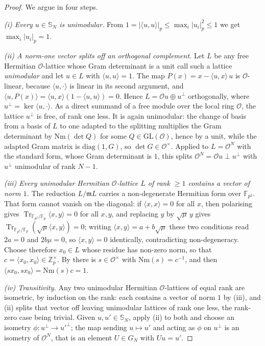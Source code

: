\documentclass{ceurart}
\theoremstyle{plain}
\theoremstyle{definition}
\theoremstyle{remark}
\theoremstyle{plain}
\newcommand{\Zp}{\mathbb{Z}_p}
\newcommand{\padicnorm}[1]{\left|#1\right|_p}
\newcommand{\inner}[2]{\langle #1, #2\rangle}
\newcommand{\OK}{\mathcal{O}}
\newcommand{\mm}{\mathfrak{m}}
\newcommand{\Sph}{\mathbb{S}}
\newcommand{\FF}{\mathbb{F}}
\newcommand{\Nm}{\mathrm{Nm}}       %
\DeclareMathOperator{\Tr}{Tr}
\begin{document}
\begin{proof}
We argue in four steps.

\emph{(i) Every $u\in\Sph_N$ is unimodular.} From
$1=\padicnorm{\inner uu}\le\max_i\padicnorm{u_i}^2\le1$ we get
$\max_i\padicnorm{u_i}=1$.

\emph{(ii) A norm-one vector splits off an orthogonal complement.} Let $L$ be
any free Hermitian $\OK$-lattice whose Gram determinant is a unit  call such
a lattice \emph{unimodular}  and let $u\in L$ with $\inner uu=1$. The map
$P(x)=x-\inner ux\,u$ is $\OK$-linear, because $\inner u\cdot$ is linear in its
second argument, and $\inner u{P(x)}=\inner ux(1-\inner uu)=0$. Hence
$L=\OK u\oplus u^{\perp}$ orthogonally, where $u^{\perp}=\ker\inner u\cdot$. As
a direct summand of a free module over the local ring $\OK$, the lattice
$u^{\perp}$ is free, of rank one less. It is again unimodular: the change of
basis from a basis of $L$ to one adapted to the splitting multiplies the Gram
determinant by $\Nm(\det Q)$ for some $Q\in\mathrm{GL}(\OK)$, hence by a unit,
while the adapted Gram matrix is $\mathrm{diag}(1,G)$, so $\det
G\in\OK^\times$. Applied to $L=\OK^{N}$ with the standard form, whose Gram
determinant is $1$, this splits $\OK^{N}=\OK u\perp u^{\perp}$ with
$u^{\perp}$ unimodular of rank $N-1$.

\emph{(iii) Every unimodular Hermitian $\OK$-lattice $L$ of rank $\ge1$
contains a vector of norm $1$.} The reduction $L/\mm L$ carries a
non-degenerate Hermitian form over $\FF_{p^2}$. That form cannot vanish on the
diagonal: if $\inner xx=0$ for all $x$, then polarising gives
$\Tr_{\FF_{p^2}/\FF_p}\inner xy=0$ for all $x,y$, and replacing $y$ by
$\sqrt\mu\,y$ gives $\Tr_{\FF_{p^2}/\FF_p}(\sqrt\mu\inner xy)=0$; writing
$\inner xy=a+b\sqrt\mu$ these two conditions read $2a=0$ and $2b\mu=0$, so
$\inner xy=0$ identically, contradicting non-degeneracy. Choose therefore
$x_0\in L$ whose residue has non-zero norm, so that
$c=\inner{x_0}{x_0}\in\Zp^\times$. By  there is
$s\in\OK^\times$ with $\Nm(s)=c^{-1}$, and then $\inner{sx_0}{sx_0}=\Nm(s)c=1$.

\emph{(iv) Transitivity.} Any two unimodular Hermitian $\OK$-lattices of equal
rank are isometric, by induction on the rank: each contains a vector of norm
$1$ by (iii), and (ii) splits that vector off leaving unimodular lattices of
rank one less, the rank-zero case being trivial. Given $u,u'\in\Sph_N$, apply
(ii) to both and choose an isometry
$\phi:u^{\perp}\to u'^{\perp}$; the map sending $u\mapsto u'$ and acting as
$\phi$ on $u^\perp$ is an isometry of $\OK^N$, that is an element $U\in G_N$
with $Uu=u'$.


\end{proof}
\end{document}
